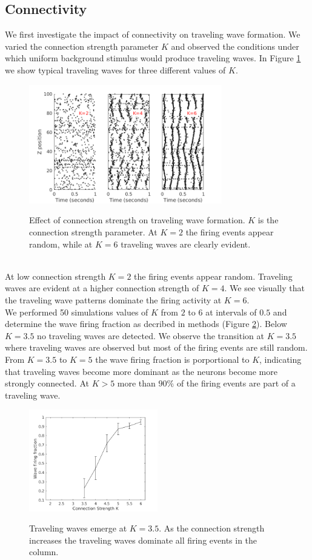 \documentclass[a4paper,11pt]{article}
\begin{document}
\subsection{Connectivity}
We first investigate the impact of connectivity on traveling wave formation.
We varied the connection strength parameter $K$ and observed the conditions under which uniform background stimulus would produce traveling waves.
In Figure \ref{fig:strength_effect} we show typical traveling waves for three different values of $K$.
\begin{figure}[!htb]
 \caption{Effect of connection strength on traveling wave formation. $K$ is the connection strength parameter. At $K=2$ the firing events appear random, while at $K=6$ traveling waves are clearly evident.}
 \centering
   \includegraphics[width=0.75\textwidth]{fig/ConnectionStrengthWaves}  
 \label{fig:strength_effect}
\end{figure}
\\
At low connection strength $K=2$ the firing events appear random.
Traveling waves are evident at a higher connection strength of $K=4$.
We see visually that the traveling wave patterns dominate the firing activity at $K=6$. \\
We performed 50 simulations values of $K$ from $2$ to $6$ at intervals of $0.5$ and determine the wave firing fraction as decribed in methods (Figure \ref{fig:conn_fraction}).
Below $K=3.5$ no traveling waves are detected.
We observe the transition at $K=3.5$ where traveling waves are observed but most of the firing events are still random.
From $K=3.5$ to $K=5$ the wave firing fraction is porportional to $K$, indicating that traveling waves become more dominant as the neurons become more strongly connected.
At $K>5$ more than $90\%$ of the firing events are part of a traveling wave.
\begin{figure}[!htb]
 \caption{Traveling waves emerge at $K=3.5$. As the connection strength increases the traveling waves dominate all firing events in the column.}
 \centering
   \includegraphics[width=0.5\textwidth]{fig/ConnectionStrengthWaveFraction}  
 \label{fig:conn_fraction}
\end{figure}
\end{document}
